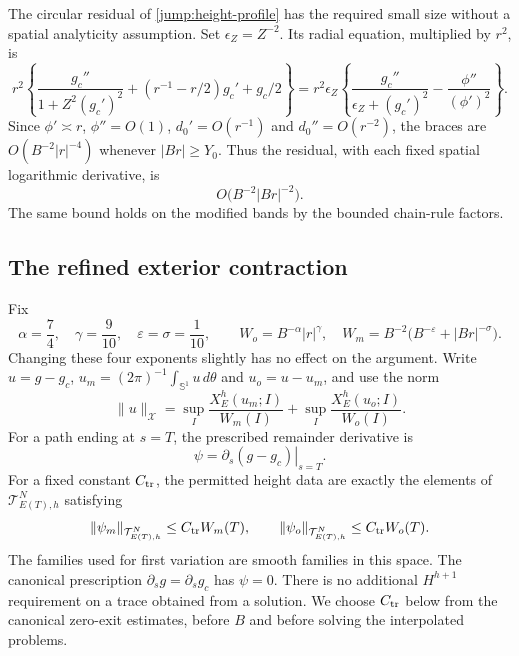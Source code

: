 The circular residual of \eqref{jump:height-profile} has the required
small size without a spatial analyticity assumption.  Set
$\epsilon_Z=Z^{-2}$.  Its radial equation, multiplied by $r^2$, is
\[
 r^2\left\{\frac{g_c''}{1+Z^2(g_c')^2}
                +(r^{-1}-r/2)g_c'+g_c/2\right\}
 =r^2\epsilon_Z\left\{
 \frac{g_c''}{\epsilon_Z+(g_c')^2}
                       -\frac{\phi''}{(\phi')^2}\right\}.
\]
Since $\phi'\asymp r$, $\phi''=O(1)$,
$d_0'=O(r^{-1})$ and $d_0''=O(r^{-2})$,
the braces are $O(B^{-2}|r|^{-4})$ whenever $|Br|\geq Y_0$.
Thus the residual, with each fixed spatial logarithmic derivative, is
\begin{equation}\label{jump:profile-residual}
 O\bigl(B^{-2}|Br|^{-2}\bigr).
\end{equation}
The same bound holds on the modified bands by the bounded chain-rule factors.

\subsection{The refined exterior contraction}

Fix
\begin{equation}\label{jump:weights}
 \alpha=\frac74,\quad \gamma=\frac9{10},\quad
 \varepsilon=\sigma=\frac1{10},\qquad
 W_o=B^{-\alpha}|r|^\gamma,\quad
 W_m=B^{-2}\bigl(B^{-\varepsilon}+|Br|^{-\sigma}\bigr).
\end{equation}
Changing these four exponents slightly has no effect on the argument.
Write $u=g-g_c$, $u_m=(2\pi)^{-1}\int_{\mathbb S^1}u\,d\theta$
and $u_o=u-u_m$, and use the norm
\begin{equation}\label{jump:refined-norm}
 \|u\|_{\mathcal X}=
 \sup_I\frac{X_E^h(u_m;I)}{W_m(I)}+
 \sup_I\frac{X_E^h(u_o;I)}{W_o(I)}.
\end{equation}
For a path ending at $s=T$, the prescribed remainder derivative is
\[
 \psi=\left.\partial_s(g-g_c)\right|_{s=T}.
\]
For a fixed constant $C_{\rm tr}$, the permitted height data are
exactly the elements of
$\mathcal T^N_{E(T),h}$ satisfying
\begin{equation}\label{jump:permitted-data}
 \|\psi_m\|_{\mathcal T^N_{E(T),h}}\leq C_{\rm tr}W_m(T),
 \qquad
 \|\psi_o\|_{\mathcal T^N_{E(T),h}}\leq C_{\rm tr}W_o(T).
\end{equation}
The families used for first variation are smooth families in this
space.  The canonical prescription $\partial_sg=\partial_sg_c$
has $\psi=0$.  There is no additional $H^{h+1}$ requirement on a
trace obtained from a solution.  We choose $C_{\rm tr}$ below from
the canonical zero-exit estimates, before $B$ and before solving
the interpolated problems.

